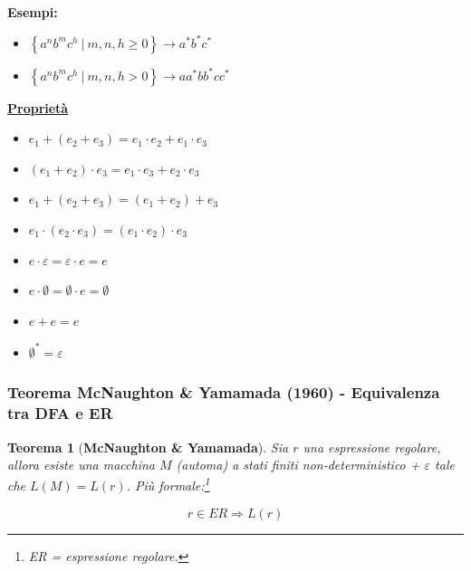 \documentclass[a4paper]{article}
\newtheorem{theorem}{Teorema}
\begin{document}
	\noindent
	\textcolor{Green4}{\textbf{Esempi:}}
	
	\begin{itemize}[label=-]
		\item $\left\{a^{n} b^{m} c^{h} \: \left| \: m,n,h \ge 0 \right.\right\} \longrightarrow a^{*} b^{*} c^{*}$
		
		\item $\left\{a^{n} b^{m} c^{h} \: \left| \: m,n,h > 0 \right.\right\} \longrightarrow aa^{*} bb^{*} cc^{*}$
	\end{itemize}

	\noindent
	\textcolor{Red3}{\textbf{\underline{Proprietà}}}
	
	\begin{itemize}[label=]
		\item $e_{1} + \left(e_{2} + e_{3}\right) = e_{1}\cdot e_{2} + e_{1} \cdot e_{3}$
		
		\item $\left(e_{1} + e_{2}\right) \cdot e_{3} = e_{1} \cdot e_{3} + e_{2} \cdot e_{3}$
		
		\item $e_{1} + \left(e_{2} + e_{3}\right) = \left(e_{1} + e_{2}\right) + e_{3}$
		
		\item $e_{1} \cdot \left(e_{2} \cdot e_{3}\right) = \left(e_{1} \cdot e_{2}\right) \cdot e_{3}$
		
		\item $e \cdot \varepsilon = \varepsilon \cdot e = e$
		
		\item $e \cdot \emptyset = \emptyset \cdot e = \emptyset$
		
		\item $e + e = e$
		
		\item $\emptyset^{*} = \varepsilon$
	\end{itemize}

	\newpage
	
	\subsubsection{Teorema McNaughton \& Yamamada (1960) - Equivalenza tra DFA e ER}

	\begin{theorem}[\textbf{McNaughton \& Yamamada}]
		Sia $r$ una espressione regolare, allora esiste una macchina $M$ (automa) a stati finiti non-deterministico + $\varepsilon$ tale che $L\left(M\right) = L\left(r\right)$. Più formale:\footnote{ER = espressione regolare.}
		
		\begin{equation*}
			r \in ER \Longrightarrow L\left(r\right)
		\end{equation*}
	\end{theorem}
	
\end{document}
